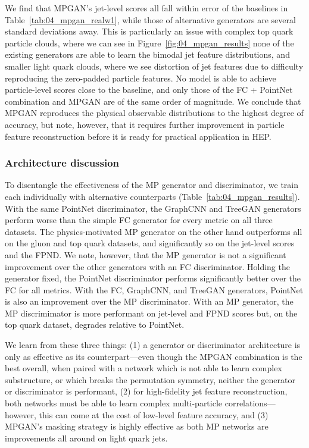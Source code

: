 We find that MPGAN's jet-level \wass scores all fall within error of the baselines in Table~\ref{tab:04_mpgan_realw1}, while those of alternative generators are several standard deviations away. 
This is particularly an issue with complex top quark particle clouds, where we can see in Figure~\ref{fig:04_mpgan_results} none of the existing generators are able to learn the bimodal jet feature distributions, and smaller light quark clouds, where we see distortion of jet features due to difficulty reproducing the zero-padded particle features. 
No model is able to achieve particle-level scores close to the baseline, and only those of the FC + PointNet combination and MPGAN are of the same order of magnitude.
We conclude that MPGAN reproduces the physical observable distributions to the highest degree of accuracy, but note, however, that it requires further improvement in particle feature reconstruction before it is ready for practical application in HEP.

\subsubsection{Architecture discussion}

To disentangle the effectiveness of the MP generator and discriminator, we train each individually with alternative counterparts (Table~\ref{tab:04_mpgan_results}). 
With the same PointNet discriminator, the GraphCNN and TreeGAN generators perform worse than the simple FC generator for every metric on all three datasets.
The physics-motivated MP generator on the other hand outperforms all on the gluon and top quark datasets, and significantly so on the jet-level \wass scores and the FPND. 
We note, however, that the MP generator is not a significant improvement over the other generators with an FC discriminator. 
Holding the generator fixed, the PointNet discriminator performs significantly better over the FC for all metrics.
With the FC, GraphCNN, and TreeGAN generators, PointNet is also an improvement over the MP discriminator.
With an MP generator, the MP discrimimator is more performant on jet-level \wass and FPND scores but, on the top quark dataset, degrades \wassp relative to PointNet.

We learn from these three things: (1) a generator or discriminator architecture is only as effective as its counterpart---even though the MPGAN combination is the best overall, when paired with a network which is not able to learn complex substructure, or which breaks the permutation symmetry, neither the generator or discriminator is performant, (2) for high-fidelity jet feature reconstruction, both networks must be able to learn complex multi-particle correlations---however, this can come at the cost of low-level feature accuracy, and (3) MPGAN's masking strategy is highly effective as both MP networks are improvements all around on light quark jets.


